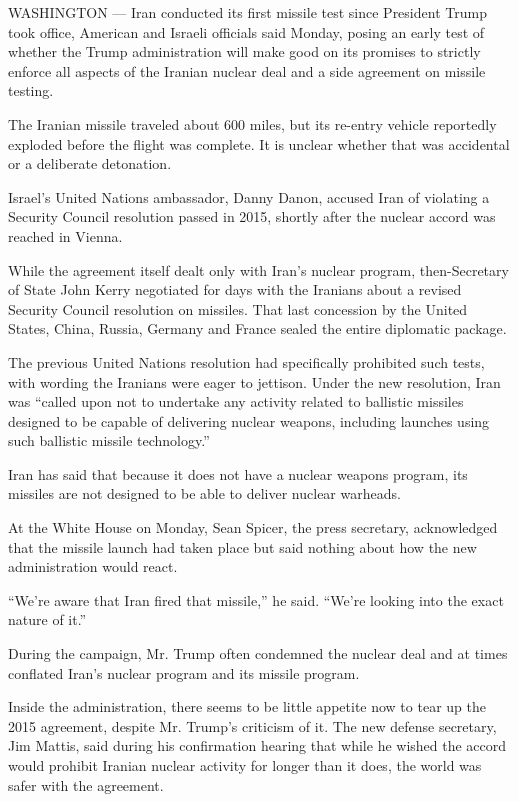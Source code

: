 WASHINGTON --- Iran conducted its first missile test since President
Trump took office, American and Israeli officials said Monday, posing an
early test of whether the Trump administration will make good on its
promises to strictly enforce all aspects of the Iranian nuclear deal and
a side agreement on missile testing.

The Iranian missile traveled about 600 miles, but its re-entry vehicle
reportedly exploded before the flight was complete. It is unclear
whether that was accidental or a deliberate detonation.

Israel's United Nations ambassador, Danny Danon, accused Iran of
violating a Security Council resolution passed in 2015, shortly after
the nuclear accord was reached in Vienna.

While the agreement itself dealt only with Iran's nuclear program,
then-Secretary of State John Kerry negotiated for days with the Iranians
about a revised Security Council resolution on missiles. That last
concession by the United States, China, Russia, Germany and France
sealed the entire diplomatic package.

The previous United Nations resolution had specifically prohibited such
tests, with wording the Iranians were eager to jettison. Under the new
resolution, Iran was ``called upon not to undertake any activity related
to ballistic missiles designed to be capable of delivering nuclear
weapons, including launches using such ballistic missile technology.''

Iran has said that because it does not have a nuclear weapons program,
its missiles are not designed to be able to deliver nuclear warheads.

At the White House on Monday, Sean Spicer, the press secretary,
acknowledged that the missile launch had taken place but said nothing
about how the new administration would react.

``We're aware that Iran fired that missile,'' he said. ``We're looking
into the exact nature of it.''

During the campaign, Mr. Trump often condemned the nuclear deal and at
times conflated Iran's nuclear program and its missile program.

Inside the administration, there seems to be little appetite now to tear
up the 2015 agreement, despite Mr. Trump's criticism of it. The new
defense secretary, Jim Mattis, said during his confirmation hearing that
while he wished the accord would prohibit Iranian nuclear activity for
longer than it does, the world was safer with the agreement.

